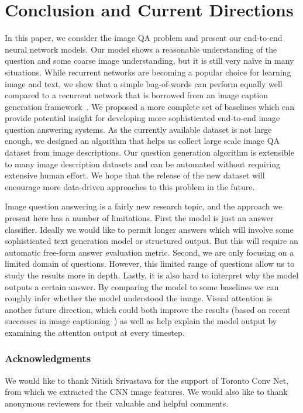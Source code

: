 \documentclass{article} %
\renewcommand{\#}[1]{\textbf{#1}}
\begin{document}
\section{Conclusion and Current Directions}

In this paper, we consider the image QA problem and present our end-to-end
neural network models. Our model shows a reasonable understanding of the
question and some coarse image understanding, but it is still very na\"{i}ve in
many situations. While recurrent networks are becoming a popular choice for
learning image and text, we show that a simple bag-of-words can perform equally
well compared to a recurrent network that is borrowed from an image caption
generation framework~\cite{vinyals14}. We proposed a more complete set of
baselines which can provide potential insight for developing more sophisticated
end-to-end image question answering systems. As the currently available dataset
is not large enough, we designed an algorithm that helps us collect large scale
image QA dataset from image descriptions. Our question generation algorithm is
extensible to many image description datasets and can be automated without
requiring extensive human effort. We hope that the release of the new dataset
will encourage more data-driven approaches to this problem in the future.

Image question answering is a fairly new research topic, and the approach we
present here has a number of limitations. First the model is just an answer
classifier. Ideally we would like to permit longer answers which will involve
some sophisticated text generation model or structured output. But this will
require an automatic free-form answer evaluation metric. Second, we are only
focusing on a limited domain of questions. However, this limited range of
questions allow us to study the results more in depth. Lastly, it is also hard
to interpret why the model outputs a certain answer. By comparing the model to
some baselines we can roughly infer whether the model understood the image.
Visual attention is another future direction, which could both improve the
results (based on recent successes in image captioning~\cite{xu15}) as well as
help explain the model output by examining the attention output at every
timestep.

\subsubsection*{Acknowledgments}

We would like to thank Nitish Srivastava for the support of Toronto Conv Net,
from which we extracted the CNN image features. We would also like to thank
anonymous reviewers for their valuable and helpful comments.

\begin{small}


\end{small}
\end{document}
